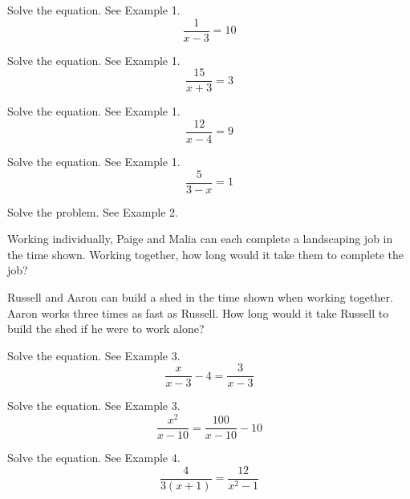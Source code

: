 \documentclass{article}
\newenvironment{practice}[2]{}{}        %
\newcommand{\answer}[1]{}               %
\newcommand{\placeholder}[2]{}          %
\begin{document}
\begin{practice}{15}{1}
Solve the equation. See Example 1.
\[
\frac{1}{x-3}=10
\]
\answer{$x=\frac{31}{10}$}
\end{practice}

\begin{practice}{16}{1}
Solve the equation. See Example 1.
\[
\frac{15}{x+3}=3
\]
\answer{$x=2$}
\end{practice}

\begin{practice}{17}{1}
Solve the equation. See Example 1.
\[
\frac{12}{x-4}=9
\]
\answer{$x=\frac{16}{3}$}
\end{practice}

\begin{practice}{18}{1}
Solve the equation. See Example 1.
\[
\frac{5}{3-x}=1
\]
\answer{$x=-2$}
\end{practice}

\begin{practice}{19}{2}
Solve the problem. See Example 2.

Working individually, Paige and Malia can each complete a landscaping job in the time shown. Working together, how long would it take them to complete the job?

\placeholder{illustration}{Landscaping scene with two workers; labels ``Malia 4 hours'' and ``Paige 6 hours.''}
\answer{$2\frac{2}{5}$ hours}
\end{practice}

\begin{practice}{20}{2}
Russell and Aaron can build a shed in the time shown when working together. Aaron works three times as fast as Russell. How long would it take Russell to build the shed if he were to work alone?

\placeholder{illustration}{Shed construction scene; speech bubble: ``Russell and Aaron can build the shed in 8 hours working together.''}
\answer{32 hours}
\end{practice}

\begin{practice}{21}{1}
Solve the equation. See Example 3.
\[
\frac{x}{x-3}-4=\frac{3}{x-3}
\]
\answer{no solution}
\end{practice}

\begin{practice}{22}{1}
Solve the equation. See Example 3.
\[
\frac{x^2}{x-10}=\frac{100}{x-10}-10
\]
\answer{$x=-20$}
\end{practice}

\begin{practice}{23}{1}
Solve the equation. See Example 4.
\[
\frac{4}{3(x+1)}=\frac{12}{x^2-1}
\]
\answer{$x=10$}
\end{practice}
\end{document}
